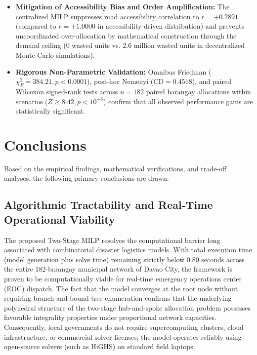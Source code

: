 \begin{itemize}
    \item \textbf{Mitigation of Accessibility Bias and Order Amplification:} The centralized MILP suppresses road accessibility correlation to $r = +0.2891$ (compared to $r = +1.0000$ in accessibility-driven distribution) and prevents uncoordinated over-allocation by mathematical construction through the demand ceiling ($0$ wasted units vs. $2.6$ million wasted units in decentralized Monte Carlo simulations).
    \item \textbf{Rigorous Non-Parametric Validation:} Omnibus Friedman ($\chi_F^2 = 384.21, p < 0.0001$), post-hoc Nemenyi ($\text{CD} = 0.4518$), and paired Wilcoxon signed-rank tests across $n = 182$ paired barangay allocations within scenarios ($Z \ge 8.42, p < 10^{-6}$) confirm that all observed performance gains are statistically significant.
\end{itemize}


\section{Conclusions}
\label{sec:conclusions}

Based on the empirical findings, mathematical verifications, and trade-off analyses, the following primary conclusions are drawn:

\subsection{Algorithmic Tractability and Real-Time Operational Viability}
The proposed Two-Stage MILP resolves the computational barrier long associated with combinatorial disaster logistics models. With total execution time (model generation plus solve time) remaining strictly below 0.80 seconds across the entire 182-barangay municipal network of Davao City, the framework is proven to be computationally viable for real-time emergency operations center (EOC) dispatch. The fact that the model converges at the root node without requiring branch-and-bound tree enumeration confirms that the underlying polyhedral structure of the two-stage hub-and-spoke allocation problem possesses favorable integrality properties under proportional network capacities. Consequently, local governments do not require supercomputing clusters, cloud infrastructure, or commercial solver licenses; the model operates reliably using open-source solvers (such as HiGHS) on standard field laptops.

